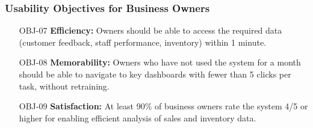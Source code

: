 \documentclass[]{VUMIFTemplateClass}
\begin{document}
\subsubsection{Usability Objectives for Business Owners}
\begin{itemize}
    \item[OBJ-07]\label{OBJ-07} \textbf{Efficiency:} Owners should be able to access the required data (customer feedback, staff performance, inventory) within 1 minute.  
    \item[OBJ-08]\label{OBJ-08} \textbf{Memorability:} Owners who have not used the system for a month should be able to navigate to key dashboards with fewer than 5 clicks per task, without retraining.  
    \item[OBJ-09]\label{OBJ-09} \textbf{Satisfaction:} At least 90\% of business owners rate the system 4/5 or higher for enabling efficient analysis of sales and inventory data.

\end{itemize}

\end{document}
